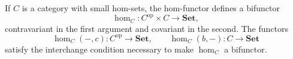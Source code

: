 If $C$ is a category with small hom-sets, the hom-functor defines a bifunctor
$$\hom_C: C^{\mathrm{op}} \times C \to \mathbf{Set},$$
contravariant in the first argument and covariant in the second. The functors
$$\hom_C(-, c): C^{\mathrm{op}} \to \mathbf{Set}, \qquad \hom_C(b, -): C \to \mathbf{Set}$$
satisfy the interchange condition necessary to make $\hom_C$ a bifunctor.
